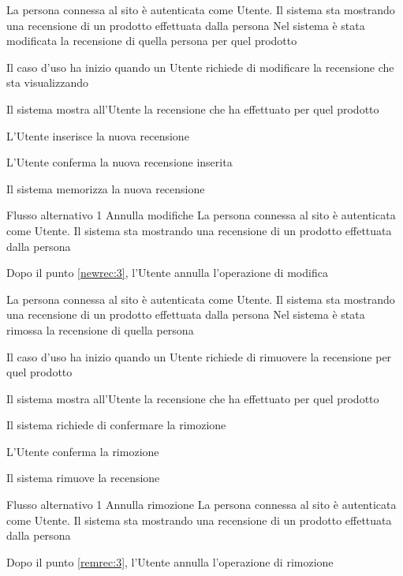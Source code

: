 
{}
{La persona connessa al sito è autenticata come Utente. Il sistema sta mostrando una recensione di un prodotto effettuata dalla persona}
{Nel sistema è stata modificata la recensione di quella persona per quel prodotto}
{\begin{enumCU}
	\item Il caso d'uso ha inizio quando un Utente richiede di modificare la recensione che sta visualizzando
	\item Il sistema mostra all'Utente la recensione che ha effettuato per quel prodotto
	\item L'Utente inserisce la nuova recensione \label{newrec:3}
	\item L'Utente conferma la nuova recensione inserita
	\item Il sistema memorizza la nuova recensione
\end{enumCU}}
%
{Flusso alternativo 1}%
{Annulla modifiche}%
{La persona connessa al sito è autenticata come Utente. Il sistema sta mostrando una recensione di un prodotto effettuata dalla persona}
{\postNulle}%
{\begin{enumCU}
		\item Dopo il punto \ref{newrec:3}, l'Utente annulla l'operazione di modifica
	\end{enumCU}}%


{}
{La persona connessa al sito è autenticata  come Utente. Il sistema sta mostrando una recensione di un prodotto effettuata dalla persona}
{Nel sistema è stata rimossa la recensione di quella persona}
{\begin{enumCU}
	\item Il caso d'uso ha inizio quando un Utente richiede di rimuovere la recensione per quel prodotto
	\item Il sistema mostra all'Utente la recensione che ha effettuato per quel prodotto
	\item Il sistema richiede di confermare la rimozione \label{remrec:3}
	\item L'Utente conferma la rimozione
	\item Il sistema rimuove la recensione
\end{enumCU}}
%
{Flusso alternativo 1}%
{Annulla rimozione}%
{La persona connessa al sito è autenticata  come Utente. Il sistema sta mostrando una recensione di un prodotto effettuata dalla persona}
{\postNulle}%
{\begin{enumCU}
		\item Dopo il punto \ref{remrec:3}, l'Utente annulla l'operazione di rimozione
	\end{enumCU}}%

